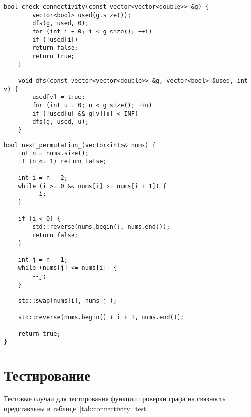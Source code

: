 \begin{lstlisting}[caption={Функция проверки графа на связность и dfs}, label={lst:connectivity}]
	bool check_connectivity(const vector<vector<double>> &g) {
		vector<bool> used(g.size());
		dfs(g, used, 0);
		for (int i = 0; i < g.size(); ++i)
		if (!used[i])
		return false;
		return true;
	}
	
	void dfs(const vector<vector<double>> &g, vector<bool> &used, int v) {
		used[v] = true;
		for (int u = 0; u < g.size(); ++u)
		if (!used[u] && g[v][u] < INF)
		dfs(g, used, u);
	}
\end{lstlisting}
\clearpage
\begin{lstlisting}[caption={Функция генерации следующей в лексикографическом порядке перестановки}, label=lst:next_permutation]
bool next_permutation_(vector<int>& nums) {
	int n = nums.size();
	if (n <= 1) return false;
	
	int i = n - 2;
	while (i >= 0 && nums[i] >= nums[i + 1]) {
		--i;
	}
	
	if (i < 0) {
		std::reverse(nums.begin(), nums.end());
		return false;
	}
	
	int j = n - 1;
	while (nums[j] <= nums[i]) {
		--j;
	}
	
	std::swap(nums[i], nums[j]);
	
	std::reverse(nums.begin() + i + 1, nums.end());
	
	return true;
}
\end{lstlisting}

\section{Тестирование}
Тестовые случаи для тестирования функции проверки графа на связность представлены в таблице~\ref{tab:connectivity_test}.

